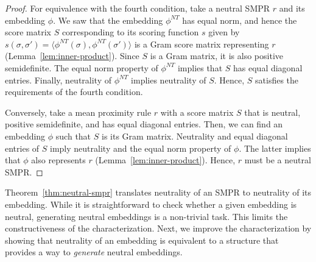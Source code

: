 \documentclass[prodmode]{acmsmall-ec14}
\newcommand{\nt}{NT}
\begin{document}
\begin{proof}
For equivalence with the fourth condition, take a neutral SMPR $r$ and its embedding $\phi$. We saw that the embedding $\phi^{\nt}$ has equal norm, and hence the score matrix $S$ corresponding to its scoring function $s$ given by $s(\sigma,\sigma') = \langle \phi^{\nt}(\sigma),\phi^{\nt}(\sigma')\rangle$ is a Gram score matrix representing $r$ (Lemma~\ref{lem:inner-product}). Since $S$ is a Gram matrix, it is also positive semidefinite. The equal norm property of $\phi^{\nt}$ implies that $S$ has equal diagonal entries. Finally, neutrality of $\phi^{\nt}$ implies neutrality of $S$. Hence, $S$ satisfies the requirements of the fourth condition. 

Conversely, take a mean proximity rule $r$ with a score matrix $S$ that is neutral, positive semidefinite, and has equal diagonal entries. Then, we can find an embedding $\phi$ such that $S$ is its Gram matrix. Neutrality and equal diagonal entries of $S$ imply neutrality and the equal norm property of $\phi$. The latter implies that $\phi$ also represents $r$ (Lemma~\ref{lem:inner-product}). Hence, $r$ must be a neutral SMPR. 
\end{proof}


\noindent
Theorem~\ref{thm:neutral-smpr} translates neutrality of an SMPR to neutrality of its embedding. While it is straightforward to check whether a given embedding is neutral, generating neutral embeddings is a non-trivial task. This limits the constructiveness of the characterization. Next, we improve the characterization by showing that neutrality of an embedding is equivalent to a structure that provides a way to \emph{generate} neutral embeddings. 
\end{document}
